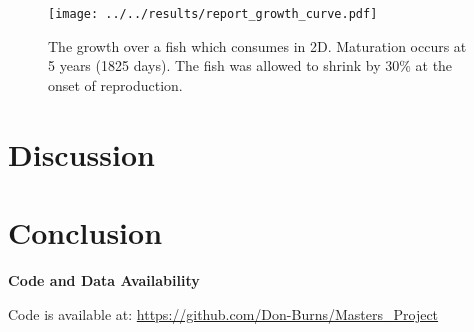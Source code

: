 \documentclass[a4paper, 11pt, hidelinks]{article} %
\begin{document}
	
	\begin{figure}
		
		\texttt{[image: ../../results/report\_growth\_curve.pdf]}
		\caption{The growth over a fish which consumes in 2D.  Maturation occurs at 5 years (1825 days).  The fish was allowed to shrink by 30\% at the onset of reproduction.}
		\label{growth_curve}
	\end{figure}

%		
%		
%	
%		
%		
	\nolinenumbers
	
\section{Discussion}
	\linenumbers
	
	
	
	\nolinenumbers
\section{Conclusion}
	\linenumbers
	
	
	
	\nolinenumbers
	
	\textbf{Code and Data Availability}

	Code is available at: \url{https://github.com/Don-Burns/Masters_Project}
	
	
	\newpage
	\linenumbers
	
	
	\printbibliography
	
	\nolinenumbers
	
	
	\newpage
	
	
	
\end{document}

